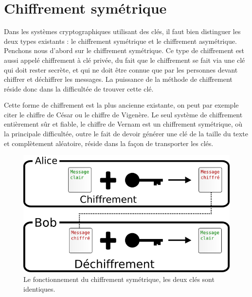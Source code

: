\section{Chiffrement symétrique}
Dans les systèmes cryptographiques utilisant des clés, il faut bien
distinguer les deux types existants : le chiffrement symétrique et le
chiffrement asymétrique. Penchons nous d'abord sur le chiffrement
symétrique. Ce type de chiffrement est aussi appelé chiffrement à clé
privée, du fait que le chiffrement se fait via une clé qui doit rester
secrète, et qui ne doit être connue que par les personnes devant
chiffrer et déchiffrer les messages. La puissance de la méthode de
chiffrement réside donc dans la difficultée de trouver cette
clé. 

Cette forme de chiffrement est la plus ancienne existante, on peut par
exemple citer le chiffre de César ou le chiffre de Vigenère. Le seul
système de chiffrement entièrement sûr et fiable, le chiffre de Vernam
est un chiffrement symétrique, où la principale difficultée, outre le
fait de devoir générer une clé de la taille du texte et complètement
aléatoire, réside dans la façon de transporter les clés.

\begin{figure}[h]
  \begin{center}
    \includegraphics[scale=0.5]{images/ChiffrementSymetrique.png}
  \end{center}
  \caption{Le fonctionnement du chiffrement symétrique, les deux clés
    sont identiques.}
  \label{fig:ChiffrementSymetrique}
\end{figure}

